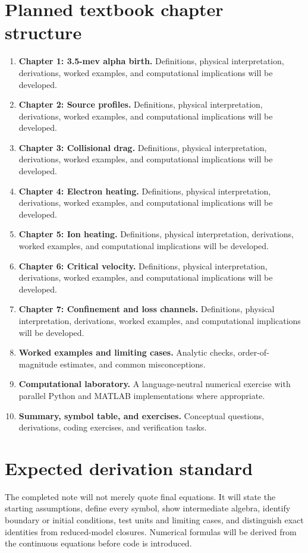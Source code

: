 \documentclass[11pt]{article}
\begin{document}
\section{Planned textbook chapter structure}
\begin{enumerate}[leftmargin=1.8em]
\item \textbf{Chapter 1: 3.5-mev alpha birth.} Definitions, physical interpretation, derivations, worked examples, and computational implications will be developed.
\item \textbf{Chapter 2: Source profiles.} Definitions, physical interpretation, derivations, worked examples, and computational implications will be developed.
\item \textbf{Chapter 3: Collisional drag.} Definitions, physical interpretation, derivations, worked examples, and computational implications will be developed.
\item \textbf{Chapter 4: Electron heating.} Definitions, physical interpretation, derivations, worked examples, and computational implications will be developed.
\item \textbf{Chapter 5: Ion heating.} Definitions, physical interpretation, derivations, worked examples, and computational implications will be developed.
\item \textbf{Chapter 6: Critical velocity.} Definitions, physical interpretation, derivations, worked examples, and computational implications will be developed.
\item \textbf{Chapter 7: Confinement and loss channels.} Definitions, physical interpretation, derivations, worked examples, and computational implications will be developed.
\item \textbf{Worked examples and limiting cases.} Analytic checks, order-of-magnitude estimates, and common misconceptions.
\item \textbf{Computational laboratory.} A language-neutral numerical exercise with parallel Python and MATLAB implementations where appropriate.
\item \textbf{Summary, symbol table, and exercises.} Conceptual questions, derivations, coding exercises, and verification tasks.
\end{enumerate}

\section{Expected derivation standard}
The completed note will not merely quote final equations. It will state the starting assumptions, define every symbol, show intermediate algebra, identify boundary or initial conditions, test units and limiting cases, and distinguish exact identities from reduced-model closures. Numerical formulas will be derived from the continuous equations before code is introduced.
\end{document}
